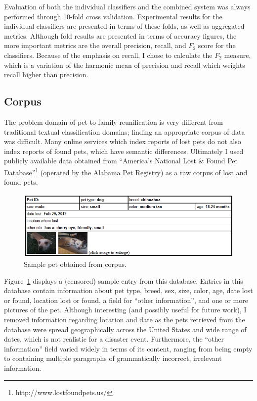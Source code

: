 Evaluation of both the individual classifiers and the combined system was always performed through 10-fold cross validation.  Experimental results for the individual classifiers are presented in terms of these folds, as well as aggregated metrics.  Although fold results are presented in terms of accuracy figures, the more important metrics are the overall precision, recall, and $F_2$ score for the classifiers.  Because of the emphasis on recall, I chose to calculate the $F_2$ measure, which is a variation of the harmonic mean of precision and recall which weights recall higher than precision.

\subsection {Corpus}

The problem domain of pet-to-family reunification is very different from traditional textual classification domains; finding an appropriate corpus of data was difficult.  Many online services which index reports of lost pets do not also index reports of found pets, which have semantic differences.  Ultimately I used publicly available data obtained from ``America's National Lost \& Found Pet Database''\footnote{http://www.lostfoundpets.us/} (operated by the Alabama Pet Registry) as a raw corpus of lost and found pets.

\begin{figure}[htbp]
    \begin{center}
	\includegraphics[width=125mm]{figs/corpus.png}
    \end{center}
        \caption[Sample Pet in Corpus]{
        Sample pet obtained from corpus.
	}
	 \label{fig:corpus}
\end{figure}

Figure~\ref{fig:corpus} displays a (censored) sample entry from this database.  Entries in this database contain information about pet type, breed, sex, size, color, age, date lost or found, location lost or found, a field for ``other information'', and one or more pictures of the pet.  Although interesting (and possibly useful for future work), I removed information regarding location and date as the pets retrieved from the database were spread geographically across the United States and wide range of dates, which is not realistic for a disaster event.  Furthermore, the ``other information'' field varied widely in terms of its content, ranging from being empty to containing multiple paragraphs of grammatically incorrect, irrelevant information.

